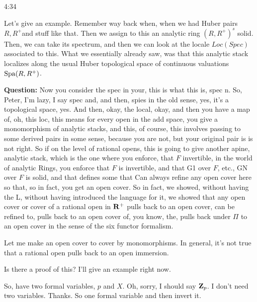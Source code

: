 \begin{unfinished}{4:34}
\begin{example}

Let's give an example. Remember way back when, when we had Huber pairs $R, R^{+}$and stuff like that. Then we assign to this an analytic ring $(R, R^{+})^s$  solid. Then, we can take its spectrum, and then we can look at the locale $Loc(Spec)$ associated to this. What we essentially already saw, was that this analytic stack localizes along the usual Huber topological space of continuous valuations $\operatorname{Spa}(R, R^{+})$.
\end{example}

\textbf{Question:}
Now you consider the spec in your, this is what this is, spec n. So, Peter, I'm lazy, I say spec and, and then, spies in the old sense, yes, it's a topological space, yes. And then, okay, the local, okay, and then you have a map of, oh, this loc, this means for every open in the add space, you give a monomorphism of analytic stacks, and this, of course, this involves passing to some derived pairs in some sense, because you are not, but your original pair is is not right. So if on the level of rational opens, this is going to give another apine, analytic stack, which is the one where you enforce, that $F$ invertible, in the world of analytic Rings, you enforce that $F$ is invertible, and that G1 over $F$, etc., GN over $F$ is solid, and that defines some that
Can always refine any open cover here so that, so in fact, you get an open cover. So in fact, we showed, without having the L, without having introduced the language for it, we showed that any open cover or cover of a rational open in $\mathbf R^+$ pulls back to an open cover, can be refined to, pulls back to an open cover of, you know, the, pulls back under $\Pi$ to an open cover in the sense of the six functor formalism.

\begin{remark}
Let me make an open cover to cover by monomorphisms. In general, it's not true that a rational open pulls back to an open immersion. 
\end{remark}


\begin{example}
Is there a proof of this? I'll give an example right now.

So, have two formal variables, $p$ and $X$. Oh, sorry, I should say $\mathbf Z_p$. I don't need two variables. Thanks. So one formal variable and then invert it. 


\end{example}
\end{unfinished}
